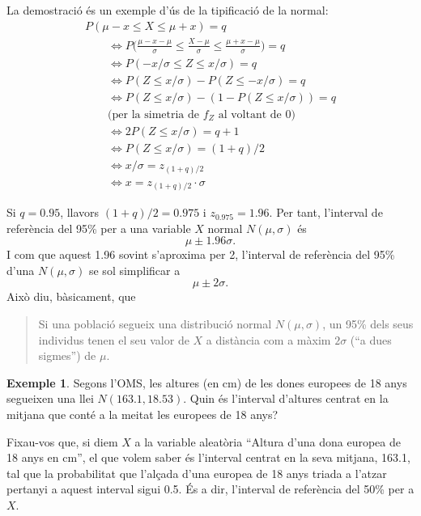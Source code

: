 \documentclass[
]{book}
\renewcommand{\leq}{\leqslant}
\newenvironment{rmdblock}[1]
  {
  \begin{itemize}
  \renewcommand{\labelitemi}{
    \raisebox{-.7\height}[0pt][0pt]{
      {\setkeys{Gin}{width=3em,keepaspectratio}\texttt{[image: Bioestadística-II\_files/figure-html/\#1]}}
    }
  }
  \setlength{\fboxsep}{1em}
  \begin{kframe}
  \item
  }
  {
  \end{kframe}
  \end{itemize}
  }
\newenvironment{rmdcorbes}
  {\begin{rmdblock}{corbes}}
  {\end{rmdblock}}
\theoremstyle{definition}
\theoremstyle{definition}
\newtheorem{example}{Exemple}[chapter]
\theoremstyle{definition}
\theoremstyle{remark}
\begin{document}
\begin{rmdcorbes}
La demostració és un exemple d'ús de la tipificació de la normal:
\[
\begin{array}{l}
P(\mu-x\leq X\leq \mu+x)=q\\
\qquad \Longleftrightarrow \displaystyle P\Big(\frac{\mu-x-\mu}{\sigma}\leq \frac{X-\mu}{\sigma}\leq \frac{\mu+x-\mu}{\sigma}\Big)=q\\
\qquad \Longleftrightarrow \displaystyle P(-x/{\sigma}\leq Z\leq {x}/{\sigma})=q\\
\qquad \Longleftrightarrow \displaystyle P(Z\leq {x}/{\sigma})-P(Z\leq -{x}/{\sigma})=q\\
\qquad \Longleftrightarrow \displaystyle P(Z\leq {x}/{\sigma})-(1-P(Z\leq {x}/{\sigma}))=q\\
\qquad \text{(per la simetria de $f_Z$ al voltant de 0)}\\
\qquad \Longleftrightarrow \displaystyle 2P(Z\leq {x}/{\sigma})=q+1\\
\qquad \Longleftrightarrow P(Z\leq {x}/{\sigma})=(1+q)/2\\
\qquad \Longleftrightarrow x/\sigma=
z_{(1+q)/2}\\
\qquad \Longleftrightarrow x=z_{(1+q)/2}\cdot \sigma
\end{array}
\]
\end{rmdcorbes}

Si \(q=0.95\), llavors \((1+q)/2=0.975\) i \(z_{0.975}=1.96\). Per tant, l'interval de referència del 95\% per a una variable \(X\) normal \(N(\mu,\sigma)\) és
\[
\mu\pm 1.96\sigma.
\]
I com que aquest 1.96 sovint s'aproxima per 2, l'interval de referència del 95\% d'una \(N(\mu,\sigma)\) se sol simplificar a
\[
\mu\pm 2\sigma.
\]
Això diu, bàsicament, que

\begin{quote}
Si una població segueix una distribució normal \(N(\mu,\sigma)\), un 95\% dels seus individus tenen el seu valor de \(X\) a distància com a màxim \(2\sigma\) (``a dues sigmes'') de \(\mu\).
\end{quote}

\begin{example}
\protect\hypertarget{exm:unnamed-chunk-110}{}{\label{exm:unnamed-chunk-110} }Segons l'OMS, les altures (en cm) de les dones europees de 18 anys segueixen una llei \(N(163.1,18.53)\). Quin és l'interval d'altures centrat en la mitjana que conté a la meitat les europees de 18 anys?
\end{example}

Fixau-vos que, si diem \(X\) a la variable aleatòria ``Altura d'una dona europea de 18 anys en cm'', el que volem saber és l'interval centrat en la seva mitjana, 163.1, tal que la probabilitat que l'alçada d'una europea de 18 anys triada a l'atzar pertanyi a aquest interval sigui 0.5. És a dir, l'interval de referència del 50\% per a \(X\).
\end{document}
